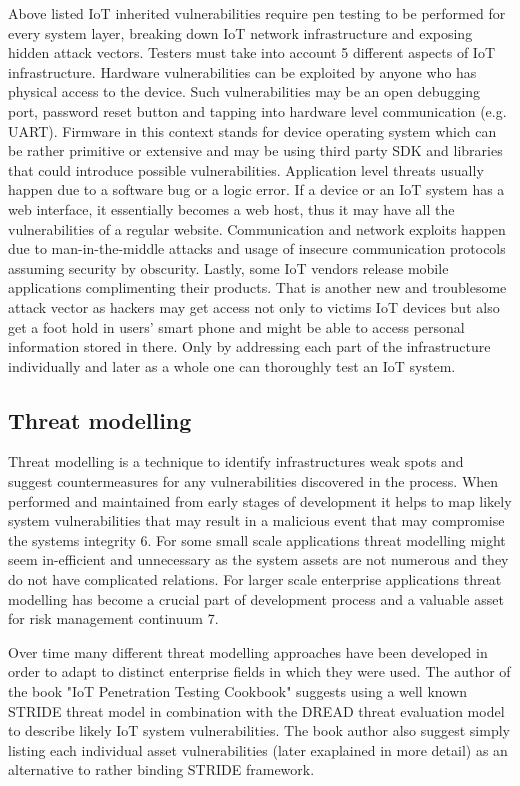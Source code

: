 Above listed IoT inherited vulnerabilities require pen testing to be performed for every system layer, breaking down IoT network infrastructure and exposing hidden attack vectors. Testers must take into account 5 different aspects of IoT infrastructure. Hardware vulnerabilities can be exploited by anyone who has physical access to the device. Such vulnerabilities may be an open debugging port, password reset button and tapping into hardware level communication (e.g. UART)\cite{attify}. Firmware in this context stands for device operating system which can be rather primitive or extensive and may be using third party SDK and libraries that could introduce possible vulnerabilities\cite {cookbook}. Application level threats usually happen due to a software bug or a logic error\cite{cookbook}. If a device or an IoT system has a web interface, it essentially becomes a web host, thus it may have all the vulnerabilities of a regular website\cite{2007:WAH:1406550}. Communication and network exploits happen due to man-in-the-middle attacks and usage of insecure communication protocols assuming security by obscurity. Lastly, some IoT vendors release mobile applications complimenting their products. That is another new and troublesome attack vector as hackers may get access not only to victims IoT devices but also get a foot hold in users' smart phone and might be able to access personal information stored in there\cite{cookbook}. Only by addressing each part of the infrastructure individually and later as a whole one can thoroughly test an IoT system.

\subsection{Threat modelling}

Threat modelling is a technique to identify infrastructures weak spots and suggest countermeasures for any vulnerabilities discovered in the process. When performed and maintained from early stages of development it helps to map likely system vulnerabilities that may result in a malicious event that may compromise the systems integrity {6}. For some small scale applications threat modelling might seem in-efficient and unnecessary as the system assets are not numerous and they do not have complicated relations. For larger scale enterprise applications threat modelling has become a crucial part of development process and a valuable asset for risk management continuum {7}. 

Over time many different threat modelling approaches have been developed in order to adapt to distinct enterprise fields in which they were used. The author of the book "IoT Penetration Testing Cookbook"\cite{cookbook} suggests using a well known STRIDE threat model in combination with the DREAD threat evaluation model to describe likely IoT system vulnerabilities. The book author also suggest simply listing each individual asset vulnerabilities (later exaplained in more detail) as an alternative to rather binding STRIDE framework\cite{cookbook}.

